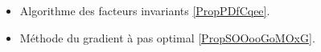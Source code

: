 
\begin{itemize}
    \item Algorithme des facteurs invariants \ref{PropPDfCqee}.
    \item Méthode du gradient à pas optimal \ref{PropSOOooGoMOxG}.
\end{itemize}

